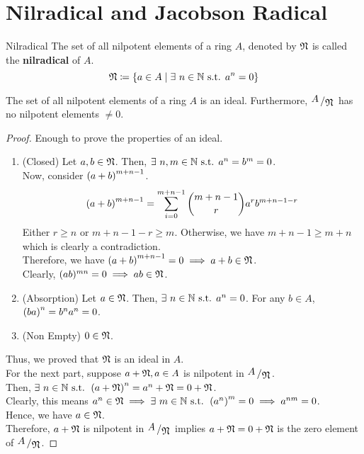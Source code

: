 \section{Nilradical and Jacobson Radical}
\begin{defn}{Nilradical}{}
	The set of all nilpotent elements of a ring \( A \), denoted by
	\( \mathfrak{N} \) is called the \textbf{nilradical} of \( A \).
	\[
		\mfN \coloneqq \fbrak{a \in A \mid \exists\ n \in \NN \st
		a^n = 0}
	\]
\end{defn}

\begin{proposition}{}{}	\label{prop:nilradical_ideal}
	The set of all nilpotent elements of a ring \( A \) is an ideal.
	Furthermore, \( \bigslant{A}{\mfN} \) has no nilpotent
	elements \( \neq 0 \).
\end{proposition}
\begin{proof}
	Enough to prove the properties of an ideal.
	\begin{enumerate}
		\item (Closed) Let \( a, b \in \mathfrak{N} \).
		Then, \( \exists\ n, m \in \NN \st a^n = b^m = 0 \). \\
		Now, consider \( \left( a+b \right)^{m+n-1} \).
		\[
			\left( a+b \right)^{m+n-1} = \sum_{i=0}^{m+n-1} \binom{m+n-1}{r}
			a^r b^{m+n-1-r}
		\]
		Either \( r \geq n \) or \( m+n-1-r \geq m \).
		Otherwise, we have \( m + n - 1 \geq m + n \) which is clearly
		a contradiction. \\
		Therefore, we have \( \left( a+b \right)^{m+n-1} = 0
		\implies a+b \in \mathfrak{N} \). \\
		Clearly, \( (ab)^{mn} = 0 \implies ab \in \mathfrak{N} \).

		\item (Absorption) Let \( a \in \mathfrak{N} \).
		Then, \( \exists\ n \in \NN \st a^n = 0 \).
		For any \( b \in A \), \( \left( ba \right)^n = b^n a^n = 0 \).

		\item (Non Empty) \( 0 \in \mathfrak{N} \).
	\end{enumerate}
	Thus, we proved that \( \mathfrak{N} \) is an ideal in \( A \). \\
	
	For the next part, suppose \( a + \mathfrak{N}, a \in A \) is nilpotent in
	\( \bigslant{A}{\mfN} \). \\
	Then, \( \exists\ n \in \NN \st \brak{a + \mfN}^n = a^n + \mfN
	= 0 + \mfN \). \\
	Clearly, this means \( a^n \in \mfN \implies \exists\ m \in \NN
	\st \brak{a^n}^m = 0 \implies a^{nm} = 0 \). \\
	Hence, we have \( a \in \mathfrak{N} \). \\
	Therefore, \( a + \mathfrak{N} \) is nilpotent in \( \bigslant{A}{\mfN} \)
	implies  \( a + \mathfrak{N} = 0 + \mathfrak{N} \) is
	the zero element of \( \bigslant{A}{\mfN} \).
\end{proof}

